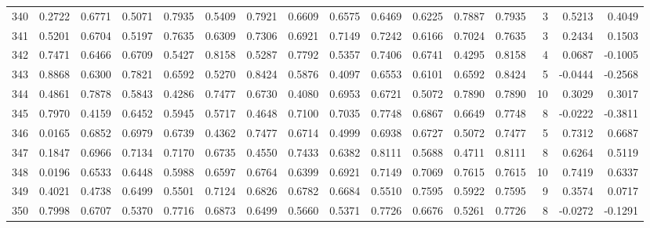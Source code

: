 \begin{tabular}{lrrrrrrrrrrrrrrr}
340 &      0.2722 &  0.6771 &  0.5071 &  0.7935 &  0.5409 &  0.7921 &  0.6609 &  0.6575 &  0.6469 &  0.6225 &   0.7887 &     0.7935 &      3 &                    0.5213 &                     0.4049 \\
341 &      0.5201 &  0.6704 &  0.5197 &  0.7635 &  0.6309 &  0.7306 &  0.6921 &  0.7149 &  0.7242 &  0.6166 &   0.7024 &     0.7635 &      3 &                    0.2434 &                     0.1503 \\
342 &      0.7471 &  0.6466 &  0.6709 &  0.5427 &  0.8158 &  0.5287 &  0.7792 &  0.5357 &  0.7406 &  0.6741 &   0.4295 &     0.8158 &      4 &                    0.0687 &                    -0.1005 \\
343 &      0.8868 &  0.6300 &  0.7821 &  0.6592 &  0.5270 &  0.8424 &  0.5876 &  0.4097 &  0.6553 &  0.6101 &   0.6592 &     0.8424 &      5 &                   -0.0444 &                    -0.2568 \\
344 &      0.4861 &  0.7878 &  0.5843 &  0.4286 &  0.7477 &  0.6730 &  0.4080 &  0.6953 &  0.6721 &  0.5072 &   0.7890 &     0.7890 &     10 &                    0.3029 &                     0.3017 \\
345 &      0.7970 &  0.4159 &  0.6452 &  0.5945 &  0.5717 &  0.4648 &  0.7100 &  0.7035 &  0.7748 &  0.6867 &   0.6649 &     0.7748 &      8 &                   -0.0222 &                    -0.3811 \\
346 &      0.0165 &  0.6852 &  0.6979 &  0.6739 &  0.4362 &  0.7477 &  0.6714 &  0.4999 &  0.6938 &  0.6727 &   0.5072 &     0.7477 &      5 &                    0.7312 &                     0.6687 \\
347 &      0.1847 &  0.6966 &  0.7134 &  0.7170 &  0.6735 &  0.4550 &  0.7433 &  0.6382 &  0.8111 &  0.5688 &   0.4711 &     0.8111 &      8 &                    0.6264 &                     0.5119 \\
348 &      0.0196 &  0.6533 &  0.6448 &  0.5988 &  0.6597 &  0.6764 &  0.6399 &  0.6921 &  0.7149 &  0.7069 &   0.7615 &     0.7615 &     10 &                    0.7419 &                     0.6337 \\
349 &      0.4021 &  0.4738 &  0.6499 &  0.5501 &  0.7124 &  0.6826 &  0.6782 &  0.6684 &  0.5510 &  0.7595 &   0.5922 &     0.7595 &      9 &                    0.3574 &                     0.0717 \\
350 &      0.7998 &  0.6707 &  0.5370 &  0.7716 &  0.6873 &  0.6499 &  0.5660 &  0.5371 &  0.7726 &  0.6676 &   0.5261 &     0.7726 &      8 &                   -0.0272 &                    -0.1291 \\

\end{tabular}
